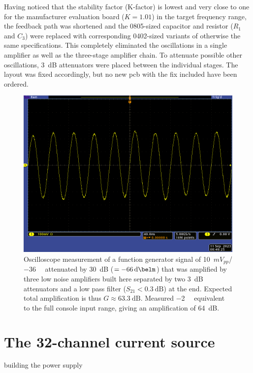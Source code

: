 Having noticed that the stability factor (K-factor) is lowest and very close to one for the manufacturer evaluation board (\(K = 1.01\)) in the target frequency range, the feedback path was shortened and the 0805-sized capacitor and resistor (\(R_1\) and \(C_3\)) were replaced with corresponding 0402-sized variants of otherwise the same specifications. This completely eliminated the oscillations in a single amplifier as well as the three-stage amplifier chain. To attenuate possible other oscillations, \qty{3}{\deci\bel} attenuators were placed between the individual stages. The layout was fixed accordingly, but no new \acrshort{pcb} with the fix included have been ordered.

\begin{figure}[hbt]
    \centering
    \includegraphics[width=\textwidth]{images/preamp-10mVpp_30dB_attenuation_3_lna_2x3dB_attenuation_27MHz_lowpass_4_protection_diodes.png}
    \caption{ Oscilloscope measurement of a function generator signal of \qty{10}{\(mV_{pp}\)}/\qty{-36}{\deci\belm} attenuated by \qty{30}{\deci\bel} (\(= \qty{-66}{\deci\belm}\)) that was amplified by three low noise amplifiers built here separated by two \qty{3}{\deci\bel} attenuators and a low pass filter (\(S_{21} < \qty{0.3}{\deci\bel}\)) at the end. Expected total amplification is thus \(G \approx \qty{63.3}{\deci\bel}\). Measured \qty{-2}{\deci\belm} equivalent to the full console input range, giving an amplification of \qty{64}{\deci\bel}.}
\end{figure}

\section{The 32-channel current source}
building the power supply


